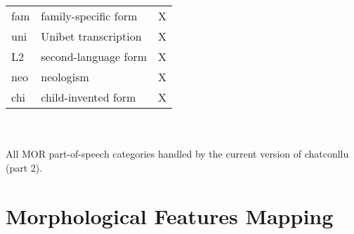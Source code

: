 \begin{table}[h!]
\begin{tabular}{@{}lll@{}}
fam & family-specific form & X\\
uni & Unibet transcription & X\\
L2 & second-language form & X\\
neo & neologism & X\\
chi & child-invented form & X\\\bottomrule
\end{tabular}\\
\vspace{0.5cm}
\\
All MOR part-of-speech categories handled by the current version of chatconllu (part 2).\\
\end{table}

\section{Morphological Features Mapping}

